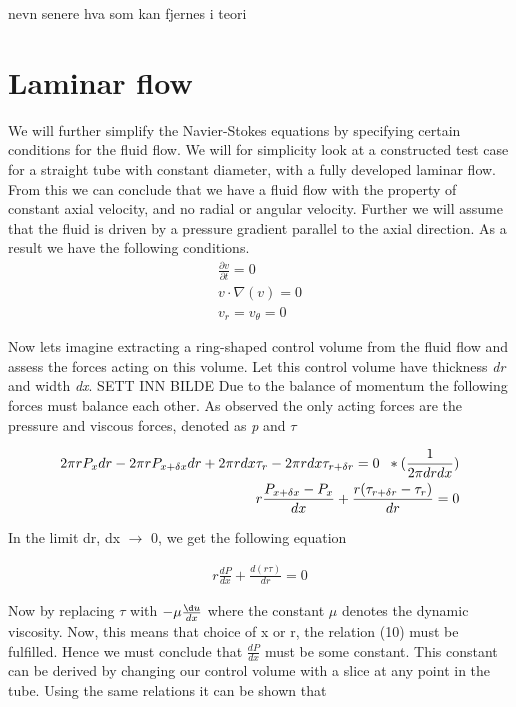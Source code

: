 \documentclass[a4paper,norsk]{article}
\begin{document}
nevn senere hva som kan fjernes i teori




\section*{Laminar flow}
We will further simplify the Navier-Stokes equations by specifying certain conditions for the fluid flow.
We will for simplicity look at a constructed test case for a straight tube with constant diameter, with a
fully developed laminar flow. From this we can conclude that we have a fluid flow with the property of constant axial velocity, and no radial
or angular velocity. Further we will assume that the fluid is driven by a pressure gradient parallel to the axial direction.
As a result we have the following conditions.
\begin{align}
\frac{\partial \textit{v}}{\partial t} = 0 \\
\textit{v} \cdot \nabla(\textit{v} ) = 0 \\
v_r = v_\theta = 0
\end{align}

Now lets imagine extracting a ring-shaped control volume from the fluid flow and assess the forces acting on this volume.
Let this control volume have thickness \textit{dr} and width \textit{dx}.
SETT INN BILDE
Due to the balance of momentum the following forces must balance each other. As observed the only acting forces are the pressure and
viscous forces, denoted as \textit{p} and \textit{$\tau$}

\begin{align}
2\pi r P_x dr - 2\pi r P_{x+\delta x}dr + 2\pi r dx \tau_{r} - 2\pi r dx \tau_{r+\delta r} = 0 \hspace{2mm}* (\frac{1}{ 2\pi dr dx}) \\
r \frac{P_{x + \delta x} - P_x}{ dx} + \frac{r (\tau_{r + \delta r} - \tau_r)}{dr} = 0
\end{align}

In the limit dr, dx $\rightarrow$ 0, we get the following equation

\begin{align}
r \frac{d P}{d x} + \frac{ d(r \tau)}{d r} = 0
\end{align}

Now by replacing $\tau$ with $-\mu \frac{\d u}{d x}$ where the constant $\mu$ denotes the dynamic viscosity. Now, this means that
choice of x or r, the relation (10) must be fulfilled. Hence we must conclude that $\frac{d P}{d x}$ must be some constant. This constant
can be derived by changing our control volume with a slice at any point in the tube. Using the same relations it can be shown that
\end{document}
